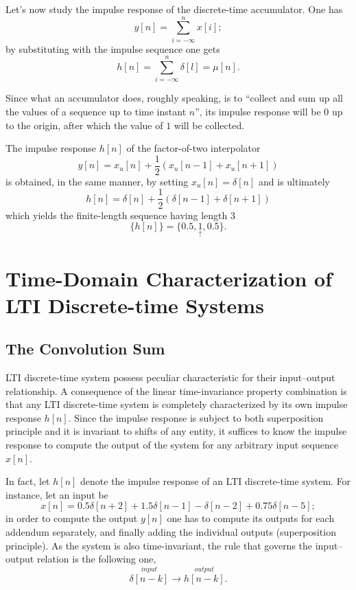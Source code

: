 \documentclass[\documentfontsize, twocolumn]{\classname}
\begin{document}
Let's now study the impulse response of the discrete-time accumulator. One has
\[
    y[n] = \sum_{i=-\infty}^{n} x[i];
\]
by substituting with the impulse sequence one gets
\[
    h[n] = \sum_{i=-\infty}^{n} \delta[l] = \mu[n].
\]

Since what an accumulator does, roughly speaking, is to ``collect and sum up all the values of a sequence up to time instant $n$'', its impulse response will be $0$ up to the origin, after which the value of $1$ will be collected.

The impulse response $h[n]$ of the factor-of-two interpolator
\[
    y[n] = x_u[n] + \frac 1 2(x_u[n-1] + x_u[n+1])
\]
is obtained, in the same manner, by setting $x_u[n]=\delta[n]$ and is ultimately
\[
    h[n] = \delta[n] + \frac 1 2(\delta[n-1] + \delta[n+1])
\]
which yields the finite-length sequence having length $3$
\[
    \{h[n]\} = \{0.5, \underset{\uparrow}{1}, 0.5\}.
\]

\section{Time-Domain Characterization of LTI Discrete-time Systems}

\subsection{The Convolution Sum}

LTI discrete-time system possess peculiar characteristic for their input--output relationship. A consequence of the linear time-invariance property combination is that any LTI discrete-time system is completely characterized by its own impulse response $h[n]$. Since the impulse response is subject to both superposition principle and it is invariant to shifts of any entity, it suffices to know the impulse response to compute the output of the system for any arbitrary input sequence $x[n]$.

In fact, let $h[n]$ denote the impulse response of an LTI discrete-time system. For instance, let an input be
\[
    x[n] = 0.5\delta[n+2] + 1.5\delta[n-1] - \delta[n-2] + 0.75\delta[n-5];
\]
in order to compute the output $y[n]$ one has to compute its outputs for each addendum separately, and finally adding the individual outputs (superposition principle). As the system is also time-invariant, the rule that governs the input--output relation is the following one,
\begin{equation}\label{eqn:impulseResponseLTI}
    \overset{input}{\delta[n-k]} \longrightarrow \overset{output}{h[n-k]}.
\end{equation}
\end{document}
